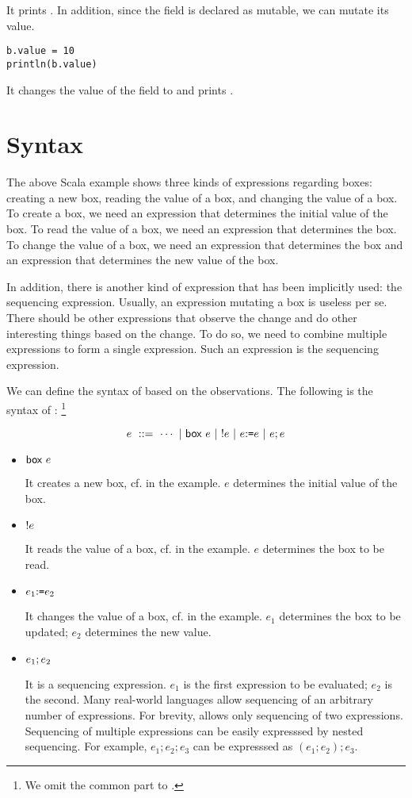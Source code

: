 It prints .
In addition, since the field  is declared as mutable, we can mutate
its value.

\begin{verbatim}
b.value = 10
println(b.value)
\end{verbatim}

It changes the value of the field to  and prints .

\section{Syntax}

The above Scala example shows three kinds of expressions regarding boxes:
creating a new box, reading the value of a box, and changing the value of a box.
To create a box, we need an expression that determines the initial value of the
box. To read the value of a box, we need an expression that determines the box.
To change the value of a box, we need an expression that determines the box and
an expression that determines the new value of the box.

In addition, there is another kind of expression that has been implicitly
used: the sequencing expression. Usually, an expression mutating a box is useless
per se. There should be other expressions that observe the change and do
other interesting things based on the change. To do so, we need to combine
multiple expressions to form a single expression. Such an expression
is the sequencing expression.

We can define the syntax of \Lang based on the observations.
The following is the syntax of \Lang:
\footnote{We omit the common part to \plang.}

\[
  e\ ::=\ \cdots\ |\ \eref{e}\ |\ \ederef{e}\ |\ \eset{e}{e}\ |\ \eseq{e}{e}
\]

\begin{itemize}
  \item $\textsf{box}\ e$

    It creates a new box, cf.  in the example.
    $e$ determines the initial value of the box.

  \item $!e$

    It reads the value of a box, cf.  in the example.
    $e$ determines the box to be read.

  \item $e_1{:}\texttt{=} e_2$

    It changes the value of a box, cf.  in the example.
    $e_1$ determines the box to be updated; $e_2$ determines the new value.

  \item $e_1;e_2$

    It is a sequencing expression. $e_1$ is the first expression to be
    evaluated; $e_2$ is the second. Many real-world languages allow sequencing
    of an arbitrary number of expressions. For brevity, \Lang allows only
    sequencing of two expressions. Sequencing of multiple expressions can be
    easily expresssed by nested sequencing. For example, $e_1;e_2;e_3$ can be
    expresssed as $(e_1;e_2);e_3$.
\end{itemize}


